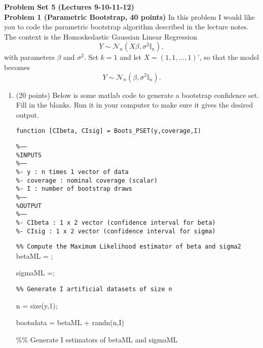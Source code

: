 \documentclass[11pt]{article} %
\begin{document}
\onehalfspace

\noindent \textbf{Problem Set 5 (Lectures 9-10-11-12)} \\

\noindent \textbf{Problem 1 (Parametric Bootstrap, 40 points)} In this problem I would like you to code the parametric bootstrap algorithm described in the lecture notes. The context is the Homoskedastic Gaussian Linear Regression
\[ Y \sim \mathcal{N}_n(X\beta, \sigma^2 \mathbb{I}_n), \]
with parameters $\beta$ and $\sigma^2$. Set $k=1$ and let $X=(1,1, \ldots, 1)’$, so that the model becomes
\[ Y \sim \mathcal{N}_n(\beta, \sigma^2 \mathbb{I}_n). \]

\begin{enumerate}
\item (20 points) Below is some matlab code to generate a bootstrap confidence set. Fill in the blanks. Run it in your computer to make sure it gives the desired output. 

\texttt{function [CIbeta, CIsig] = Boots\_PSET(y,coverage,I)}

\texttt{\%------\\
\%INPUTS\\
\%------\\
\%- y               : n times 1 vector of data  \\
\%- coverage  : nominal coverage (scalar) \\
\%- I                : number of bootstrap draws \\
\%------\\
\%OUTPUT\\
\%------\\
\%- CIbeta : 1 x 2 vector (confidence interval for beta) \\
\%- CIsig   : 1 x 2 vector (confidence interval for sigma)\\}

\texttt{\%\% Compute the Maximum Likelihood estimator of beta and sigma2} \\

betaML     = ;

sigmaML    =;

\texttt{\%\% Generate I artificial datasets of size n}

n          = size(y,1);

bootsdata  = betaML  +  randn(n,I)

\%\% Generate I estimators of betaML and sigmaML


\end{enumerate}
\end{document}
